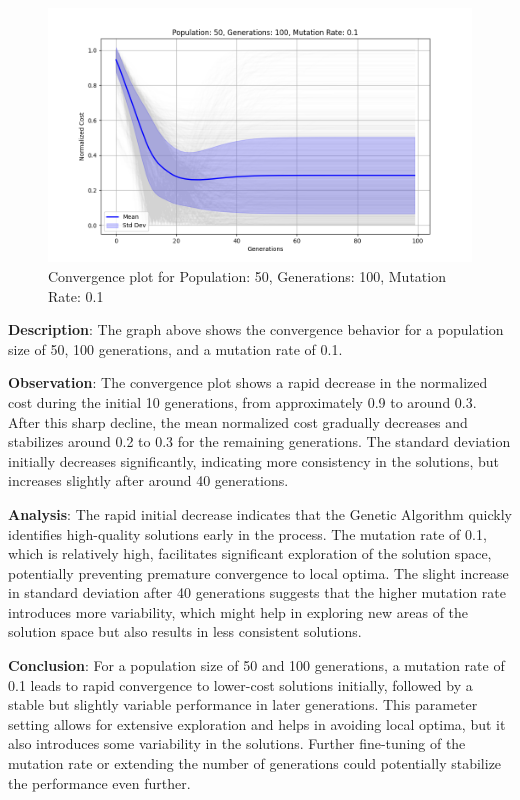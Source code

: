 \documentclass{article}
\begin{document}
    \begin{figure}[H]
        \centering
        \includegraphics[width=\textwidth]{genetic_algorithm/Population_50_Generations_100_MutationRate_0.1}
        \caption{Convergence plot for Population: 50, Generations: 100, Mutation Rate: 0.1}
        \label{fig:ga_50_100_1}
    \end{figure}

    \textbf{Description}: The graph above shows the convergence behavior for a population size of 50, 100 generations, and a mutation rate of 0.1.

    \textbf{Observation}: The convergence plot shows a rapid decrease in the normalized cost during the initial 10 generations, from approximately 0.9 to around 0.3. After this sharp decline, the mean normalized cost gradually decreases and stabilizes around 0.2 to 0.3 for the remaining generations. The standard deviation initially decreases significantly, indicating more consistency in the solutions, but increases slightly after around 40 generations.

    \textbf{Analysis}: The rapid initial decrease indicates that the Genetic Algorithm quickly identifies high-quality solutions early in the process. The mutation rate of 0.1, which is relatively high, facilitates significant exploration of the solution space, potentially preventing premature convergence to local optima. The slight increase in standard deviation after 40 generations suggests that the higher mutation rate introduces more variability, which might help in exploring new areas of the solution space but also results in less consistent solutions.

    \textbf{Conclusion}: For a population size of 50 and 100 generations, a mutation rate of 0.1 leads to rapid convergence to lower-cost solutions initially, followed by a stable but slightly variable performance in later generations. This parameter setting allows for extensive exploration and helps in avoiding local optima, but it also introduces some variability in the solutions. Further fine-tuning of the mutation rate or extending the number of generations could potentially stabilize the performance even further.
\end{document}

